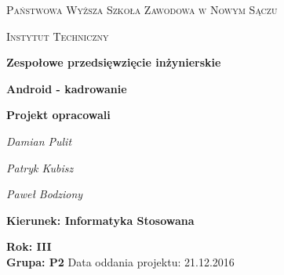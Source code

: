 \begin{titlepage}
\centering
{\scshape\LARGE Państwowa Wyższa Szkoła Zawodowa w Nowym Sączu \par}
\vspace{0.3cm}
{\scshape\Large Instytut Techniczny \par}
\vspace{1cm}
\begin{center}
{\huge \bfseries Zespołowe przedsięwzięcie inżynierskie\par}
\end{center}
\vspace{2cm}
\noindent\linia
\begin{center}
{\huge \bfseries Android - kadrowanie \par}
\end{center}
\linia
\vspace{2cm}
{\Large\bfseries Projekt opracowali\par}
{\Large\itshape Damian Pulit\par}
{\Large\itshape Patryk Kubisz\par}
{\Large\itshape Paweł Bodziony\par}
\vspace{1.5cm}
{\Large\bfseries Kierunek: Informatyka Stosowana\par}
{\Large\bfseries Rok: III}\\
{\Large\bfseries Grupa: P2}
\vfill
Data oddania projektu: 21.12.2016
\end{titlepage}
